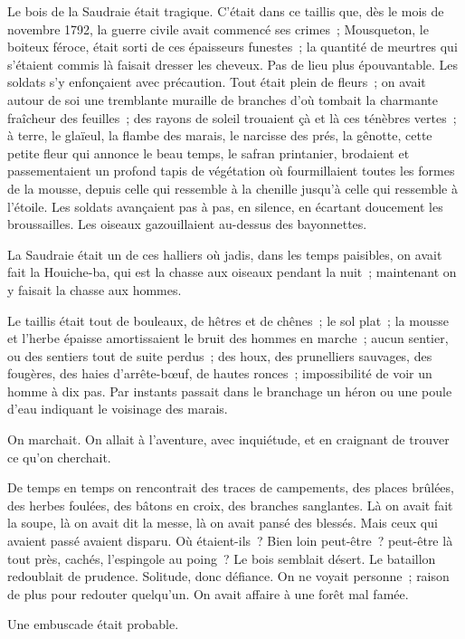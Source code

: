 \documentclass[french,twoside]{book} %
\begin{document}
Le bois de la Saudraie était tragique. C’était dans ce taillis que, dès le mois de novembre 1792, la guerre civile avait commencé ses crimes ; Mousqueton, le boiteux féroce, était sorti de ces épaisseurs funestes ; la quantité de meurtres qui s’étaient commis  là faisait dresser les cheveux. Pas de lieu plus épouvantable. Les soldats s’y enfonçaient avec précaution. Tout était plein de fleurs ; on avait autour de soi une tremblante muraille de branches d’où tombait la charmante fraîcheur des feuilles ; des rayons de soleil trouaient çà et là ces ténèbres vertes ; à terre, le glaïeul, la flambe des marais, le narcisse des prés, la gênotte, cette petite fleur qui annonce le beau temps, le safran printanier, brodaient et passementaient un profond tapis de végétation où fourmillaient toutes les formes de la mousse, depuis celle qui ressemble à la chenille jusqu’à celle qui ressemble à l’étoile. Les soldats avançaient pas à pas, en silence, en écartant doucement les broussailles. Les oiseaux gazouillaient au-dessus des bayonnettes.\par
La Saudraie était un de ces halliers où jadis, dans les temps paisibles, on avait fait la Houiche-ba, qui est la chasse aux oiseaux pendant la nuit ; maintenant on y faisait la chasse aux hommes.\par
Le taillis était tout de bouleaux, de hêtres et de chênes ; le sol plat ; la mousse et l’herbe épaisse amortissaient le bruit des hommes en marche ; aucun sentier, ou des sentiers tout de suite perdus ; des houx, des prunelliers sauvages, des fougères, des haies d’arrête-bœuf, de hautes ronces ; impossibilité de voir un homme à dix pas. Par instants passait dans le branchage un héron ou une poule d’eau indiquant le voisinage des marais.\par
On marchait. On allait à l’aventure, avec inquiétude, et en craignant de trouver ce qu’on cherchait.\par
 De temps en temps on rencontrait des traces de campements, des places brûlées, des herbes foulées, des bâtons en croix, des branches sanglantes. Là on avait fait la soupe, là on avait dit la messe, là on avait pansé des blessés. Mais ceux qui avaient passé avaient disparu. Où étaient-ils ? Bien loin peut-être ? peut-être là tout près, cachés, l’espingole au poing ? Le bois semblait désert. Le bataillon redoublait de prudence. Solitude, donc défiance. On ne voyait personne ; raison de plus pour redouter quelqu’un. On avait affaire à une forêt mal famée.\par
Une embuscade était probable.\par
\end{document}
